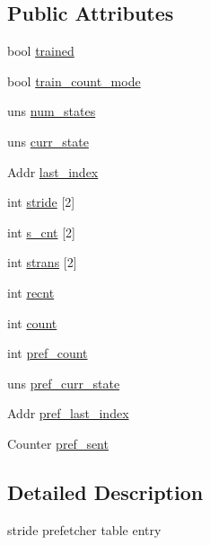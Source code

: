 \subsection*{Public Attributes}
\begin{DoxyCompactItemize}
\item 
bool \hyperlink{structstride__index__table__entry__struct_a5567f13a120eb074d5c2a1c492deda1a}{trained}
\item 
bool \hyperlink{structstride__index__table__entry__struct_afcfbd0d9aeac71f62d04e2301fef245c}{train\_\-count\_\-mode}
\item 
uns \hyperlink{structstride__index__table__entry__struct_aa70fb619383a85c1043a77d156896ba4}{num\_\-states}
\item 
uns \hyperlink{structstride__index__table__entry__struct_a96f5b8ed397a7057a53c529c912f4636}{curr\_\-state}
\item 
Addr \hyperlink{structstride__index__table__entry__struct_a9da024a8acaedce97de3a3300a3b523f}{last\_\-index}
\item 
int \hyperlink{structstride__index__table__entry__struct_a4f2bc804c4b802bdfb6cbdf06483469b}{stride} \mbox{[}2\mbox{]}
\item 
int \hyperlink{structstride__index__table__entry__struct_afdaa50e588890ef2751ff99c9efda6b6}{s\_\-cnt} \mbox{[}2\mbox{]}
\item 
int \hyperlink{structstride__index__table__entry__struct_a07f4956bed2ef638ad28455e0fae24d5}{strans} \mbox{[}2\mbox{]}
\item 
int \hyperlink{structstride__index__table__entry__struct_a63c588de02283aa0f86a28e56c4163d4}{recnt}
\item 
int \hyperlink{structstride__index__table__entry__struct_a65b6f602ef126135ee7fe18e1d9bb88a}{count}
\item 
int \hyperlink{structstride__index__table__entry__struct_ab9f70927331ab13a808b07cc390d01e2}{pref\_\-count}
\item 
uns \hyperlink{structstride__index__table__entry__struct_aa63ffe040ce62a4d58b572bb755ea37f}{pref\_\-curr\_\-state}
\item 
Addr \hyperlink{structstride__index__table__entry__struct_ab45ec7267012e2e7633c49dadf92781d}{pref\_\-last\_\-index}
\item 
Counter \hyperlink{structstride__index__table__entry__struct_aded3dabc4e2feb36882e1fad32cc1838}{pref\_\-sent}
\end{DoxyCompactItemize}


\subsection{Detailed Description}
stride prefetcher table entry 

